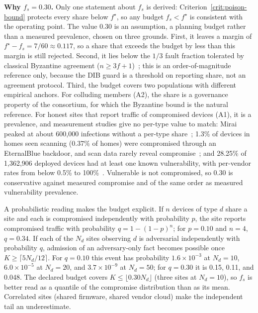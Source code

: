 \documentclass[journal]{IEEEtran}
\theoremstyle{definition}
\begin{document}
\textbf{Why $f_s=0.30$.} Only one statement about $f_s$ is derived: Criterion~\ref{crit:poison-bound} protects every share below $f^\star$, so any budget $f_s<f^\star$ is consistent with the operating point. The value $0.30$ is an assumption, a planning budget rather than a measured prevalence, chosen on three grounds. First, it leaves a margin of $f^\star-f_s=7/60\approx0.117$, so a share that exceeds the budget by less than this margin is still rejected. Second, it lies below the $1/3$ fault fraction tolerated by classical Byzantine agreement ($n\ge3f+1$)~\cite{lamport1982byzantine,castro1999pbft}; this is an order-of-magnitude reference only, because the DIB guard is a threshold on reporting share, not an agreement protocol. Third, the budget covers two populations with different empirical anchors. For colluding members (A2), the share is a governance property of the consortium, for which the Byzantine bound is the natural reference. For honest sites that report traffic of compromised devices (A1), it is a prevalence, and measurement studies give no per-type value to match: Mirai peaked at about 600{,}000 infections without a per-type share~\cite{mirai}; 1.3\% of devices in homes seen scanning (0.37\% of homes) were compromised through an EternalBlue backdoor, and scan data rarely reveal compromise~\cite{kumar2019allthings}; and 28.25\% of 1{,}362{,}906 deployed devices had at least one known vulnerability, with per-vendor rates from below 0.5\% to 100\%~\cite{zhao2022largescale}. Vulnerable is not compromised, so $0.30$ is conservative against measured compromise and of the same order as measured vulnerability prevalence.

A probabilistic reading makes the budget explicit. If $n$ devices of type $d$ share a site and each is compromised independently with probability $p$, the site reports compromised traffic with probability $q=1-(1-p)^n$; for $p=0.10$ and $n=4$, $q=0.34$. If each of the $N_d$ sites observing $d$ is adversarial independently with probability $q$, admission of an adversary-only fact becomes possible once $K\ge\lceil5N_d/12\rceil$. For $q=0.10$ this event has probability $1.6\times10^{-3}$ at $N_d=10$, $6.0\times10^{-5}$ at $N_d=20$, and $3.7\times10^{-9}$ at $N_d=50$; for $q=0.30$ it is 0.15, 0.11, and 0.048. The declared budget covers $K\le\lfloor0.30N_d\rfloor$ (three sites at $N_d=10$), so $f_s$ is better read as a quantile of the compromise distribution than as its mean. Correlated sites (shared firmware, shared vendor cloud) make the independent tail an underestimate.
\end{document}
